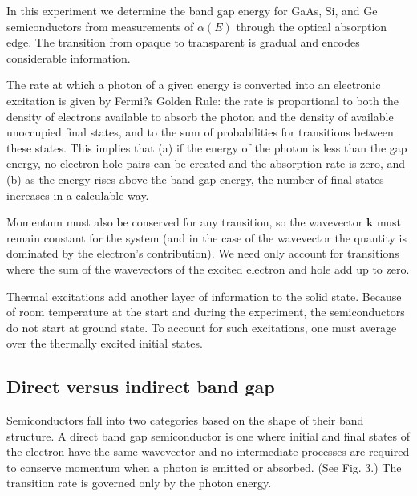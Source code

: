 \documentclass{article}
\renewcommand{\vec}[1]{\mathbf{#1}}
\begin{document}
In this experiment we determine the band gap energy for GaAs, Si, and Ge semiconductors from measurements of $\alpha(E)$ through the optical absorption edge. The transition from opaque to transparent is gradual and encodes considerable information.\cite{lab manual}

The rate at which a photon of a given energy is converted into an electronic excitation is given by Fermi?s Golden Rule: the rate is proportional to both the density of electrons available to absorb the photon and the density of available unoccupied final states, and to the sum of probabilities for transitions between these states. This implies that (a) if the energy of the photon is less than the gap energy, no electron-hole pairs can be created and the absorption rate is zero, and (b) as the energy rises above the band gap energy, the number of final states increases in a calculable way.\cite{lab manual}

Momentum must also be conserved for any transition, so the wavevector $\vec{k}$ must remain constant for the system (and in the case of the wavevector the quantity is dominated by the electron's contribution). We need only account for transitions where the sum of the wavevectors of the excited electron and hole add up to zero.\cite{lab manual}

Thermal excitations add another layer of information to the solid state. Because of room temperature at the start and during the experiment, the semiconductors do not start at ground state. To account for such excitations, one must average over the thermally excited initial states.\cite{lab manual}

\subsection{Direct versus indirect band gap}

Semiconductors fall into two categories based on the shape of their band structure.
\hspace{.25cm}
A direct band gap semiconductor is one where initial and final states of the electron have the same wavevector and no intermediate processes are required to conserve momentum when a photon is emitted or absorbed. (See Fig. 3.) The transition rate is governed only by the photon energy.\cite{lab manual}
\end{document}
